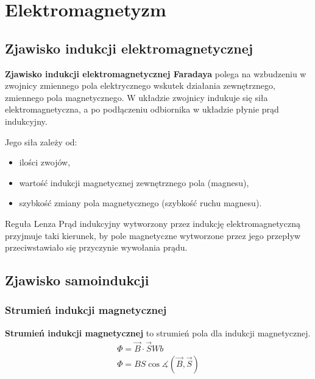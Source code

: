 \chapter{Elektromagnetyzm}

\section{Zjawisko indukcji elektromagnetycznej}\label{faraday}
\begin{definition}
  \textbf{Zjawisko indukcji elektromagnetycznej Faradaya} polega na wzbudzeniu w zwojnicy zmiennego
  pola elektrycznego wskutek działania zewnętrznego, zmiennego pola magnetycznego. W układzie
  zwojnicy indukuje się siła elektromagnetyczna, a po podłączeniu odbiornika w układzie płynie prąd
  indukcyjny.

  \vspace{1em}\noindent Jego siła zależy od:
  \begin{itemize}
    \item ilości zwojów,
    \item wartość indukcji magnetycznej zewnętrznego pola (magnesu),
    \item szybkość zmiany pola magnetycznego (szybkość ruchu magnesu).
  \end{itemize}
\end{definition}

\begin{law}{Reguła Lenza}
  Prąd indukcyjny wytworzony przez indukcję elektromagnetyczną przyjmuje taki kierunek, by pole
  magnetyczne wytworzone przez jego przepływ przeciwstawiało się przyczynie wywołania prądu.
\end{law}

\section{Zjawisko samoindukcji}

\subsection{Strumień indukcji magnetycznej}
\begin{definition}
  \textbf{Strumień indukcji magnetycznej} to strumień pola dla indukcji magnetycznej.
  \begin{equation}
    \begin{gathered}
      \Phi = \vec B \cdot \vec S\unit{Wb}\\
      \Phi = BS \cos\measuredangle(\vec B, \vec S)
    \end{gathered}
  \end{equation}
\end{definition}

